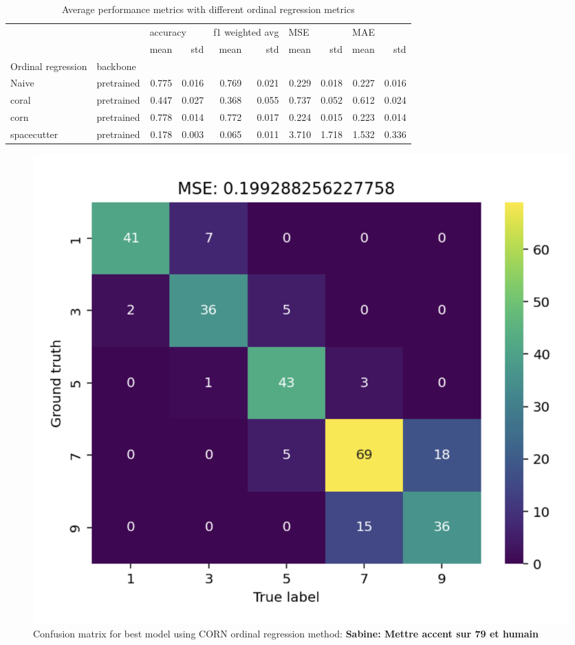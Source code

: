\documentclass[english]{article}
\begin{document}
\begin{table}[H]
    \centering
    \caption{Average performance metrics with different ordinal regression metrics}
    \label{tab:dtafracevol}
    \begin{tabular}{llrrrrrrrr}
        \toprule
                           &            & \multicolumn{2}{l}{accuracy} & \multicolumn{2}{l}{f1 weighted avg} & \multicolumn{2}{l}{MSE} & \multicolumn{2}{l}{MAE}                                 \\
                           &            & mean                         & std                                 & mean                    & std                     & mean  & std   & mean  & std   \\
        Ordinal regression & backbone   &                              &                                     &                         &                         &       &       &       &       \\
        \midrule
        Naive              & pretrained & 0.775                        & 0.016                               & 0.769                   & 0.021                   & 0.229 & 0.018 & 0.227 & 0.016 \\
        coral              & pretrained & 0.447                        & 0.027                               & 0.368                   & 0.055                   & 0.737 & 0.052 & 0.612 & 0.024 \\
        corn               & pretrained & 0.778                        & 0.014                               & 0.772                   & 0.017                   & 0.224 & 0.015 & 0.223 & 0.014 \\
        spacecutter        & pretrained & 0.178                        & 0.003                               & 0.065                   & 0.011                   & 3.710 & 1.718 & 1.532 & 0.336 \\
        \bottomrule
    \end{tabular}
\end{table}

\begin{figure}[H]
    \begin{center}
        \includegraphics[width=0.7\linewidth]{2023_a_oiv_cm}
        \caption{Confusion matrix for best model using CORN ordinal regression method: \textbf{Sabine: Mettre accent sur 79 et humain}}\label{fig:oivcm}
    \end{center}
\end{figure}
\end{document}
